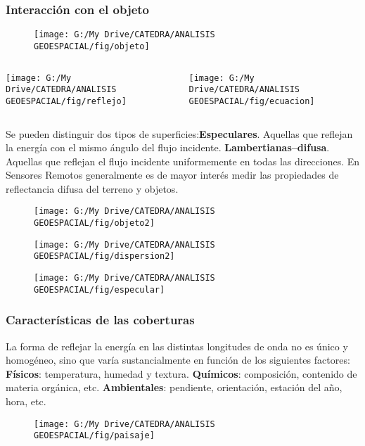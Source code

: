 \documentclass[14pt]{beamer}
\begin{document}
\begin{frame}
\frametitle{Interacción con el objeto}
  \begin{figure}
    \centering
    \texttt{[image: G:/My Drive/CATEDRA/ANALISIS GEOESPACIAL/fig/objeto]}
  \end{figure}
  \begin{columns}
	 	\begin{column}{.5\linewidth}
		 \texttt{[image: G:/My Drive/CATEDRA/ANALISIS GEOESPACIAL/fig/reflejo]}
		\end{column}
		\begin{column}{.5\linewidth}
		\texttt{[image: G:/My Drive/CATEDRA/ANALISIS GEOESPACIAL/fig/ecuacion]}
		\end{column}
	\end{columns}
\tiny{}
\end{frame}
\begin{frame}
\scriptsize{Se pueden distinguir dos tipos de superficies:\vfill\textbf{Especulares}. Aquellas que reflejan la energía con el mismo ángulo del flujo incidente.\vfill
\textbf{Lambertianas--difusa}.  Aquellas que reflejan el flujo incidente uniformemente en todas las direcciones. En Sensores Remotos generalmente es de mayor interés medir las propiedades de reflectancia difusa del terreno y objetos.} 
  \begin{figure}
    \centering
    \texttt{[image: G:/My Drive/CATEDRA/ANALISIS GEOESPACIAL/fig/objeto2]}
  \end{figure}
\tiny{}
\end{frame}
\begin{frame}
  \begin{figure}
    \centering
    \texttt{[image: G:/My Drive/CATEDRA/ANALISIS GEOESPACIAL/fig/dispersion2]}
  \end{figure}
\end{frame}
\begin{frame}
  \begin{figure}
    \centering
    \texttt{[image: G:/My Drive/CATEDRA/ANALISIS GEOESPACIAL/fig/especular]}
  \end{figure}
\end{frame}
\begin{frame}
\frametitle{Características de las coberturas}
\scriptsize{
La forma de reflejar la energía en las distintas longitudes de onda no es único y homogéneo, sino que varía sustancialmente en función de los siguientes factores:\vfill
\textbf{Físicos}: temperatura, humedad y textura.\vfill
\textbf{Químicos}: composición, contenido de materia orgánica, etc.\vfill
\textbf{Ambientales}: pendiente, orientación, estación del año, hora, etc.
}
 \begin{figure}
    \centering
    \texttt{[image: G:/My Drive/CATEDRA/ANALISIS GEOESPACIAL/fig/paisaje]}
  \end{figure}
\end{frame}
\end{document}
